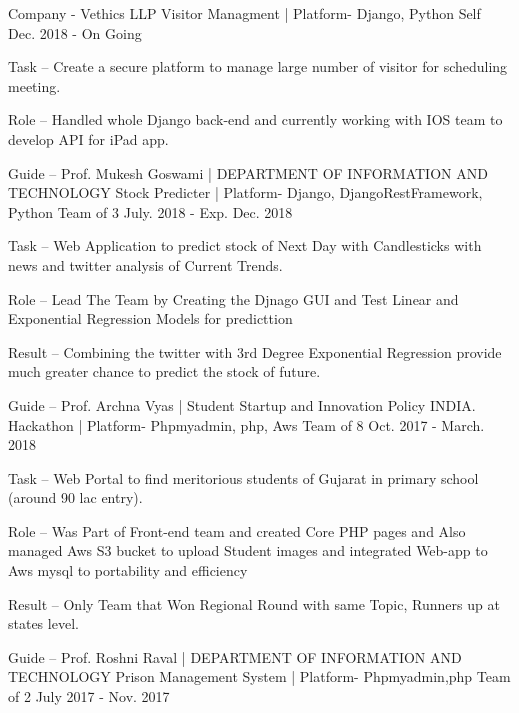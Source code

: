 
\begin{cventries}
  \cventry
    {Company - Vethics LLP}
    {Visitor Managment | Platform- Django, Python}
    {Self}
    {Dec. 2018 - On Going}
    {
      \begin{cvitems}
        \item {Task – Create a secure platform to manage large number of visitor for scheduling meeting.}
        \item {Role – Handled whole Django back-end and currently working with IOS team to develop API for iPad app.}
      \end{cvitems}
    }
  \cventry
    {Guide – Prof. Mukesh Goswami | DEPARTMENT OF INFORMATION AND TECHNOLOGY}
    {Stock Predicter | Platform- Django, DjangoRestFramework, Python}
    {Team of 3}
    {July. 2018 - Exp. Dec. 2018}
    {
      \begin{cvitems}
        \item {Task – Web Application to predict stock of Next Day with Candlesticks with news and twitter analysis of Current Trends.}
        \item {Role –  Lead The Team by Creating the Djnago GUI and Test Linear and Exponential Regression Models for predicttion}
        \item {Result –  Combining the twitter with 3rd Degree Exponential Regression provide much greater chance to predict the stock of future.}
      \end{cvitems}
    }
  \cventry
    {Guide – Prof. Archna Vyas | Student Startup and Innovation Policy INDIA. }
    {Hackathon | Platform- Phpmyadmin, php, Aws}
    {Team of 8}
    {Oct. 2017 - March. 2018}
    {
      \begin{cvitems}
        \item {Task – Web Portal to find meritorious students of Gujarat in primary school (around 90 lac entry).}
        \item {Role – Was Part of Front-end team and created Core PHP pages and Also managed Aws S3 bucket to upload Student images and integrated  Web-app to Aws mysql to portability and efficiency}
        \item {Result – Only Team that Won Regional Round with same Topic, Runners up at states level.}
        \end{cvitems}
    }
  \cventry
    {Guide – Prof. Roshni Raval | DEPARTMENT OF INFORMATION AND TECHNOLOGY}
    {Prison Management System | Platform- Phpmyadmin,php}
    {Team of 2}
    {July 2017 - Nov. 2017}
    {
      \begin{cvitems}

\end{cvitems}}
\end{cventries}
